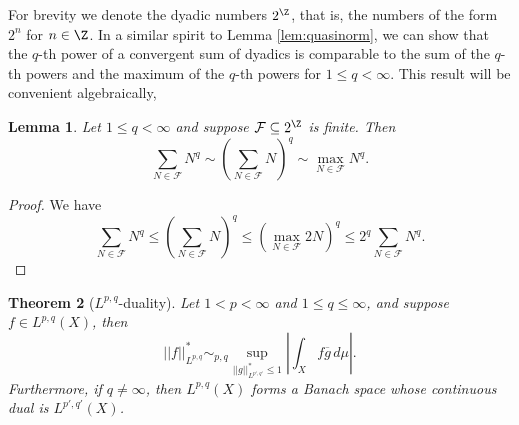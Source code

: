 \documentclass[reqno]{amsart}
\newtheorem{theorem}{Theorem}
\newtheorem{lemma}[theorem]{Lemma}
\theoremstyle{definition}
\theoremstyle{remark}
\begin{document}
For brevity we denote the dyadic numbers $2^\Z$, that is, the numbers of the form $2^n$ for $n \in \Z$. In a similar spirit to Lemma \ref{lem:quasinorm}, we can show that the $q$-th power of a convergent sum of dyadics is comparable to the sum of the $q$-th powers and the maximum of the $q$-th powers for $1 \leq q < \infty$. This result will be convenient algebraically, 

\begin{lemma}
	Let $1 \leq q < \infty$ and suppose $\mathcal F \subseteq 2^\Z$ is finite. Then 
		\[ \sum_{N \in \mathcal F} N^q \sim \left( \sum_{N \in \mathcal F} N \right)^q \sim \max_{N \in \mathcal F} N^q. \]\label{lem:dyadicalg}
\end{lemma}

\begin{proof}
	We have
		\[  \sum_{N \in \mathcal F} N^q \leq \left( \sum_{N \in \mathcal F} N \right)^q \leq \left( \max_{N \in \mathcal F} 2N \right)^q \leq 2^q \sum_{N \in \mathcal F} N^q.  \]
\end{proof}

\begin{theorem}[$L^{p, q}$-duality]
	Let $1 < p < \infty$ and $1 \leq q \leq \infty$, and suppose $f \in L^{p, q} (X)$, then 
		\[ ||f||^*_{L^{p, q}} \sim_{p, q} \sup_{||g||^*_{L^{p', q'}} \leq 1} \left| \int_X f \overline g \, d\mu \right|. \]
	Furthermore, if $q \neq \infty$, then $L^{p, q} (X)$ forms a Banach space whose continuous dual is $L^{p', q'} (X)$. 	
\end{theorem}
\end{document}
